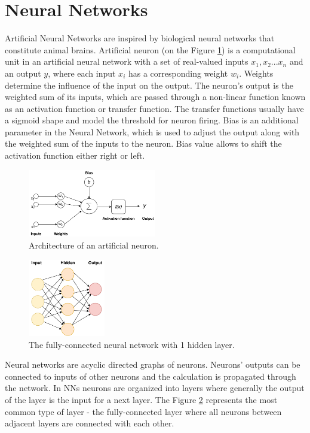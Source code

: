 \section{Neural Networks} \label{nn_section}
Artificial Neural Networks are inspired by biological neural networks that constitute animal brains. Artificial neuron (on the Figure \ref{neuron}) is a computational unit in an artificial neural network with a set of real-valued inputs $x_1, x_2 ... x_n$ and an output $y$, where each input $x_i$ has a corresponding weight $w_i$. Weights determine the influence of the input on the output. The neuron's output is the weighted sum of its inputs, which are passed through a non-linear function known as an activation function or transfer function. The transfer functions usually have a sigmoid shape and model the threshold for neuron firing. Bias is an additional parameter in the Neural Network, which is used to adjust the output along with the weighted sum of the inputs to the neuron. Bias value allows to shift the activation function either right or left.

\begin{figure}[hbt]
  \centering
  \includegraphics[width=0.5\textwidth]{figures/ai_neuron.pdf}
  \caption{Architecture of an artificial neuron.}
  \label{neuron}
\end{figure}

\begin{figure}[hbt]
  \centering
  \includegraphics[width=0.3\textwidth, height=0.2\textheight]{figures/nn.pdf}
  \caption{The fully-connected neural network with 1 hidden layer.}
  \label{nn}
\end{figure}

Neural networks are acyclic directed graphs of neurons. Neurons' outputs can be connected to inputs of other neurons and the calculation is propagated through the network. In NNs neurons are organized into layers where generally the output of the layer is the input for a next layer. The Figure \ref{nn} represents the most common type of layer - the fully-connected layer where all neurons between adjacent layers are connected with each other.

